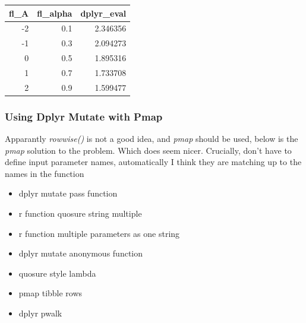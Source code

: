 \documentclass[
]{book}
\newenvironment{Shaded}{\begin{snugshade}}{\end{snugshade}}
\newcommand{\CommentTok}[1]{\textcolor[rgb]{0.56,0.35,0.01}{\textit{#1}}}
\newcommand{\ControlFlowTok}[1]{\textcolor[rgb]{0.13,0.29,0.53}{\textbf{#1}}}
\newcommand{\DecValTok}[1]{\textcolor[rgb]{0.00,0.00,0.81}{#1}}
\newcommand{\KeywordTok}[1]{\textcolor[rgb]{0.13,0.29,0.53}{\textbf{#1}}}
\newcommand{\NormalTok}[1]{#1}
\newcommand{\OperatorTok}[1]{\textcolor[rgb]{0.81,0.36,0.00}{\textbf{#1}}}
\newcommand{\StringTok}[1]{\textcolor[rgb]{0.31,0.60,0.02}{#1}}
\providecommand{\tightlist}{%
  \setlength{\itemsep}{0pt}\setlength{\parskip}{0pt}}
\begin{document}
\begin{table}[!h]
\centering
\begin{tabular}{r|r|r}
\hline
fl\_A & fl\_alpha & dplyr\_eval\\
\hline
\rowcolor{gray!6}  -2 & 0.1 & 2.346356\\
\hline
-1 & 0.3 & 2.094273\\
\hline
\rowcolor{gray!6}  0 & 0.5 & 1.895316\\
\hline
1 & 0.7 & 1.733708\\
\hline
\rowcolor{gray!6}  2 & 0.9 & 1.599477\\
\hline
\end{tabular}
\end{table}

\hypertarget{using-dplyr-mutate-with-pmap}{%
\subsubsection{Using Dplyr Mutate with Pmap}\label{using-dplyr-mutate-with-pmap}}

Apparantly \emph{rowwise()} is not a good idea, and \emph{pmap} should be used, below is the \emph{pmap} solution to the problem. Which does seem nicer. Crucially, don't have to define input parameter names, automatically I think they are matching up to the names in the function

\begin{itemize}
\tightlist
\item
  dplyr mutate pass function
\item
  r function quosure string multiple
\item
  r function multiple parameters as one string
\item
  dplyr mutate anonymous function
\item
  quosure style lambda
\item
  pmap tibble rows
\item
  dplyr pwalk
\end{itemize}

\begin{Shaded}
\end{Shaded}
\end{document}
